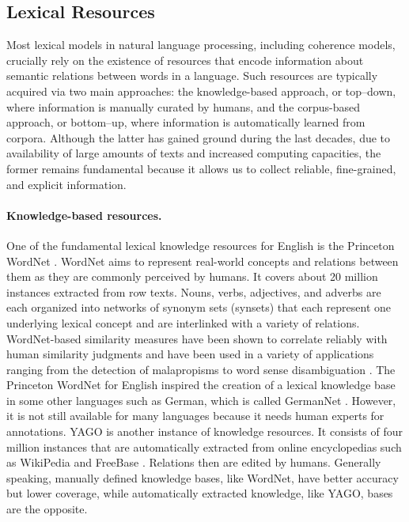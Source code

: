 \subsection{Lexical Resources} 

Most lexical models in natural language processing, including coherence models, crucially rely on the existence of resources that encode information about semantic relations between words in a language. 
Such resources are typically acquired via two main approaches: the knowledge-based approach, or top–down, where information is manually curated by humans, and the corpus-based approach, or bottom–up, where information is automatically learned from corpora. 
Although the latter has gained ground during the last decades, due to availability of large amounts of texts and increased computing capacities, the former remains fundamental because it allows us to collect reliable, fine-grained, and explicit information. 

\paragraph{Knowledge-based resources.}
One of the fundamental lexical knowledge resources for English is the Princeton WordNet \cite{fellbaum98}.  
WordNet aims to represent real-world concepts and relations between them as they are commonly perceived by humans. 
It covers about 20 million instances extracted from row texts. 
Nouns, verbs, adjectives, and adverbs are each organized into networks of synonym sets (synsets) that each represent one underlying lexical concept and are interlinked with a variety of relations. 
WordNet-based similarity measures have been shown to correlate reliably with human similarity judgments and have been used in a variety of applications ranging from the detection of malapropisms to word sense disambiguation \cite{budanitsky06}.  
The Princeton WordNet for English inspired the creation of a lexical knowledge base in some other languages such as German, which is called GermanNet \cite{hamp97}. 
However, it is not still available for many languages because it needs human experts for annotations.  
YAGO \cite{hoffart13} is another instance of knowledge resources.  
It consists of four million instances that are automatically extracted from online encyclopedias such as WikiPedia \cite{denoyer06} and FreeBase \cite{bollacker08}. 
Relations then are edited by humans. 
Generally speaking, manually defined knowledge bases, like WordNet, have better accuracy but lower coverage, while automatically extracted knowledge, like YAGO, bases are the opposite. 

